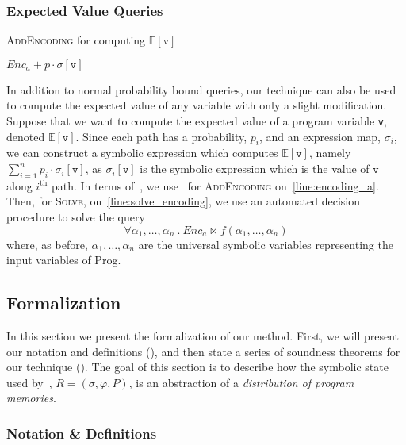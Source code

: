 \documentclass[acmsmall,review,anonymous]{acmart}\settopmatter{printfolios=true,printccs=false,printacmref=false}
\newcommand*\E[1]{\mathbb{E}\left[ #1 \right]}
\begin{document}
\subsubsection{Expected Value Queries}
\label{sec:expected_value}

\begin{algorithm}
  \caption{\textsc{AddEncoding} for computing $\E{\mathtt{v}}$}
  \label{alg:expected_val_encoding}
  \begin{algorithmic}[1]
    \State\Return $Enc_a + p \cdot \sigma[\mathtt{v}]$
    \EndFunction
  \end{algorithmic}
\end{algorithm}

In addition to normal probability bound queries, our technique can also be used to compute the expected value of any variable with only a slight modification.
% 
Suppose that we want to compute the expected value of a program variable \texttt{v}, denoted $\E{\mathtt{v}}$.
% 
Since each path has a probability, $p_i$, and an expression map, $\sigma_i$, we can construct a symbolic expression which computes $\E{\mathtt{v}}$, namely $\sum_{i=1}^n p_i \cdot \sigma_i[\mathtt{v}]$, as $\sigma_i[\mathtt{v}]$ is the symbolic expression which is the value of $\mathtt{v}$ along $i^\text{th}$ path.
% 
In terms of~, we use~ for \textsc{AddEncoding} on~\cref{line:encoding_a}.
% 
Then, for \textsc{Solve}, on~\cref{line:solve_encoding}, we use an automated decision procedure to solve the query
\[
	\forall \alpha_1,\ldots,\alpha_n~.~Enc_a \bowtie f(\alpha_1,\ldots,\alpha_n)
\]
where, as before, $\alpha_1,\ldots,\alpha_n$ are the universal symbolic variables representing the input variables of \textsf{Prog}.

\subsection{Formalization}
\label{sec:formalization}

In this section we present the formalization of our method. First, we will present our notation and definitions (), and then state a series of soundness theorems for our technique ().
% 
The goal of this section is to describe how the symbolic state used by~, $R=(\sigma,\varphi,P)$, is an abstraction of a \textit{distribution of program memories}.

\subsubsection{Notation \& Definitions}
\label{sec:notation}
\end{document}
